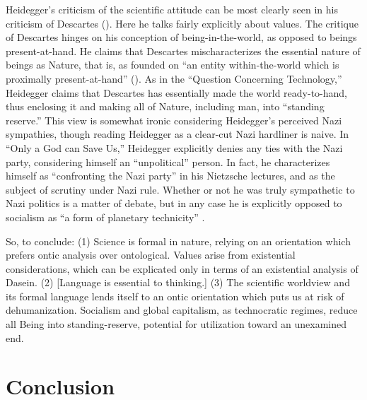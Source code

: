 \documentclass[leqno, 12pt]{turabian-researchpaper}
\begin{document}

	Heidegger's criticism of the scientific attitude can be most clearly seen in
	his criticism of Descartes (). Here
	he talks fairly explicitly about values. The critique of Descartes hinges on
	his conception of being-in-the-world, as opposed to beings present-at-hand. He
	claims that Descartes mischaracterizes the essential nature of beings as
	Nature, that is, as founded on \enquote{an entity within-the-world which is proximally present-at-hand}
	(). As in the \enquote{Question Concerning Technology,}
	\nocite{heidegger2008c} Heidegger claims that Descartes has essentially made
	the world ready-to-hand, thus enclosing it and making all of Nature, including
	man, into \enquote{standing reserve.} This view is somewhat ironic considering
	Heidegger's perceived Nazi sympathies, though reading Heidegger as a clear-cut
	Nazi hardliner is naive. In \enquote{Only a God can Save Us,} Heidegger explicitly
	denies any ties with the Nazi party, considering himself an \enquote{unpolitical}
	person. In fact, he characterizes himself as \enquote{confronting the Nazi party}
	in his Nietzsche lectures, and as the subject of scrutiny under Nazi rule.
	Whether or not he was truly sympathetic to Nazi politics is a matter of debate,
	but in any case he is explicitly opposed to socialism as \enquote{a form of planetary technicity}
	\autocite[206]{heidegger1981}.

	So, to conclude: (1) Science is formal in nature, relying on an orientation which
	prefers ontic analysis over ontological. Values arise from existential
	considerations, which can be explicated only in terms of an existential analysis
	of Dasein. (2) [Language is essential to thinking.] (3) The scientific worldview
	and its formal language lends itself to an ontic orientation which puts us at risk
	of dehumanization. Socialism and global capitalism, as technocratic regimes,
	reduce all Being into standing-reserve, potential for utilization toward an unexamined
	end.

	\section{Conclusion}
\end{document}

